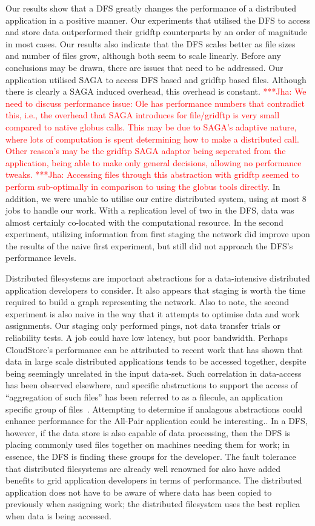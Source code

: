 \documentclass[a4paper,11pt]{article}
\newcommand{\jhanote}[1]{ {\textcolor{red} { ***Jha: #1 }}}
\newcommand{\jhanote}[1]{}
\begin{document}
Our results show that a DFS greatly changes the performance of a distributed application in a positive manner. Our experiments that utilised the DFS to access and store data outperformed their gridftp counterparts by an order of magnitude in most cases. Our results also indicate that the DFS scales better as file sizes and number of files grow, although both seem to scale linearly. Before any conclusions may be drawn, there are issues that need to be addressed. Our application utilised SAGA to access DFS based and gridftp based files. Although there is clearly a SAGA induced overhead, this overhead is constant.  \jhanote{ We need to discuss performance issue: Ole has performance numbers that contradict this, i.e., the overhead that SAGA introduces for file/gridftp is very small compared to native globus calls. This may be due to SAGA's adaptive nature, where lots of computation is spent determining how to make a distributed call. Other reason's may be the gridftp SAGA adaptor being seperated from the application, being able to make only general decisions, allowing no performance tweaks. } \jhanote{Accessing files through this abstraction with gridftp seemed to perform sub-optimally in comparison to using the globus tools directly.} In addition, we were unable to utilise our entire distributed system, using at most 8 jobs to handle our work. With a replication level of two in the DFS, data was almost certainly co-located with the computational resource. In the second experiment, utilizing information from first staging the network did improve upon the results of the naive first experiment, but still did not approach the DFS's performance levels.

Distributed filesystems are important abstractions for a data-intensive distributed application developers to consider. It also appears that staging is worth the time required to build a graph representing the network. Also to note, the second experiment is also naive in the way that it attempts to optimise data and work assignments. Our staging only performed pings, not data transfer trials or reliability tests. A job could have low latency, but poor bandwidth. Perhaps CloudStore's performance can be attributed to recent work that has shown that data in large scale distributed applications tends to be accessed together, despite being seemingly unrelated in the input data-set. Such correlation in data-access
has been observed elsewhere, and specific abstractions to support the
access of ``aggregation of such files'' has been referred to as a filecule, an application specific group of files~\cite{filecule}. Attempting to determine 
if analagous abstractions could enhance performance for the All-Pair application could be interesting.. In a DFS, however, if the data store is also capable of data processing, then the DFS is placing commonly used files together on machines needing them for work; in essence, the DFS is finding these groups for the developer. The fault tolerance that distributed filesystems are already well renowned for also have added benefits to grid application developers in terms of performance. The distributed application does not have to be aware of where data has been copied to previously when assigning work; the distributed filesystem uses the best replica when data is being accessed.
\end{document}
